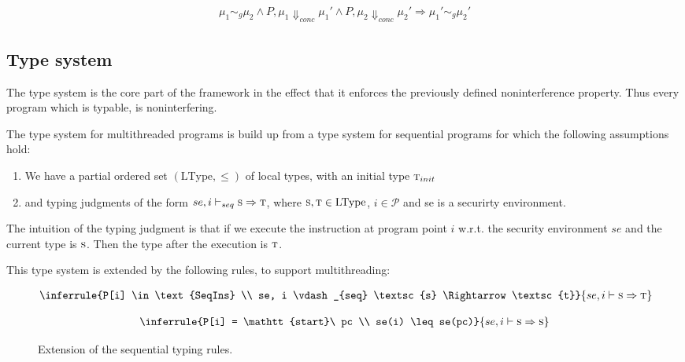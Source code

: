 \documentclass[a4paper,10pt]{llncs}
\begin{document}
\begin{align*}
\mu_1 \sim_g \mu_2 \land P,\mu_1 \Downarrow_{conc} \mu_1' \land P,\mu_2 \Downarrow_{conc} \mu_2' \Rightarrow \mu_1' \sim_g \mu_2'
\end{align*}

\subsection{Type system}
\label{sec:typesystem}
The type system is the core part of the framework in the effect that it
enforces the previously defined noninterference property. Thus every
program which is typable, is noninterfering.

The type system for multithreaded programs is build up from a type system
for sequential programs for which the following assumptions hold:

\begin{enumerate}
\item We have a partial ordered set $(\text{LType}, \leq)$ of local types, with an initial
      type $\textsc{t}_{init}$
\item and typing judgments of the form $se, i \vdash_{seq} \textsc{s} \Rightarrow \textsc{t}$, where
      $\textsc{s}, \textsc{t} \in \text{LType}$, $i \in \mathcal{P}$ and se is a securirty environment.
\end{enumerate}

The intuition of the typing judgment is that if we execute the instruction at program
point $i$ w.r.t. the security environment $se$ and the current type is $\textsc{s}$. Then the
type after the execution is $\textsc{t}$.

This type system is extended by the following rules, to support multithreading:

\begin{figure}
\begin{minipage}{.5\textwidth}
\begin{align*}
\inferrule{P[i] \in \text{SeqIns} \\ se, i \vdash_{seq} \textsc{s} \Rightarrow \textsc{t}}
{se, i \vdash \textsc{s} \Rightarrow \textsc{t}}
\end{align*}
\end{minipage}
\begin{minipage}{.5\textwidth}
\begin{align*}
\inferrule{P[i] = \mathtt{start}\ pc \\ se(i) \leq se(pc)}
{se, i \vdash \textsc{s} \Rightarrow \textsc{s}}
\end{align*}
\end{minipage}
\caption{Extension of the sequential typing rules.}
\label{fig:multithreaded-typing-rules}
\end{figure}
\end{document}
